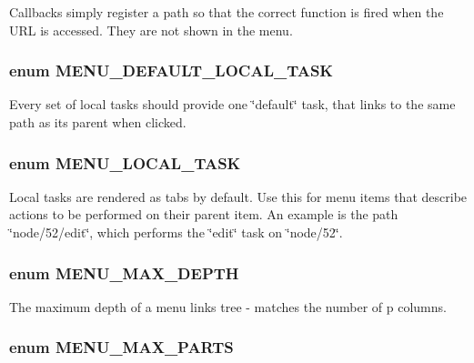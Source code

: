 Callbacks simply register a path so that the correct function is fired when the URL is accessed. They are not shown in the menu. \hypertarget{group__menu_g251e324e062f2e4c703f51231c0d7dc5}{
\subsubsection[{MENU\_\-DEFAULT\_\-LOCAL\_\-TASK}]{\setlength{\rightskip}{0pt plus 5cm}enum {\bf MENU\_\-DEFAULT\_\-LOCAL\_\-TASK}}}
\label{group__menu_g251e324e062f2e4c703f51231c0d7dc5}


Every set of local tasks should provide one \char`\"{}default\char`\"{} task, that links to the same path as its parent when clicked. \hypertarget{group__menu_g4dc67226400f237bd3c0a5ef7126008b}{
\subsubsection[{MENU\_\-LOCAL\_\-TASK}]{\setlength{\rightskip}{0pt plus 5cm}enum {\bf MENU\_\-LOCAL\_\-TASK}}}
\label{group__menu_g4dc67226400f237bd3c0a5ef7126008b}


Local tasks are rendered as tabs by default. Use this for menu items that describe actions to be performed on their parent item. An example is the path \char`\"{}node/52/edit\char`\"{}, which performs the \char`\"{}edit\char`\"{} task on \char`\"{}node/52\char`\"{}. \hypertarget{group__menu_gae0d9e2610b50124cc0d2b120058c9b8}{
\subsubsection[{MENU\_\-MAX\_\-DEPTH}]{\setlength{\rightskip}{0pt plus 5cm}enum {\bf MENU\_\-MAX\_\-DEPTH}}}
\label{group__menu_gae0d9e2610b50124cc0d2b120058c9b8}


The maximum depth of a menu links tree - matches the number of p columns. \hypertarget{group__menu_g57d50c60b259e886bac766d4ef33abb5}{
\subsubsection[{MENU\_\-MAX\_\-PARTS}]{\setlength{\rightskip}{0pt plus 5cm}enum {\bf MENU\_\-MAX\_\-PARTS}}}
\label{group__menu_g57d50c60b259e886bac766d4ef33abb5}


